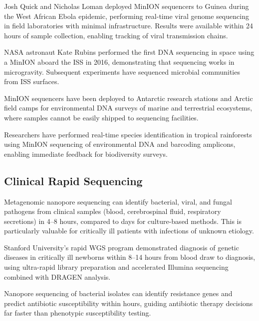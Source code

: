 \begin{description}[style=nextline, itemsep=3pt]
  \item[Ebola outbreak (2015--2016)] Josh Quick and Nicholas Loman deployed MinION sequencers to Guinea during the West African Ebola epidemic, performing real-time viral genome sequencing in field laboratories with minimal infrastructure. Results were available within 24 hours of sample collection, enabling tracking of viral transmission chains.

  \item[International Space Station] NASA astronaut Kate Rubins performed the first DNA sequencing in space using a MinION aboard the ISS in 2016, demonstrating that sequencing works in microgravity. Subsequent experiments have sequenced microbial communities from ISS surfaces.

  \item[Antarctic and Arctic research] MinION sequencers have been deployed to Antarctic research stations and Arctic field camps for environmental DNA surveys of marine and terrestrial ecosystems, where samples cannot be easily shipped to sequencing facilities.

  \item[Rainforest biodiversity] Researchers have performed real-time species identification in tropical rainforests using MinION sequencing of environmental DNA and barcoding amplicons, enabling immediate feedback for biodiversity surveys.
\end{description}

\subsection{Clinical Rapid Sequencing}
\label{subsec:emerging:clinical-rapid}

\begin{description}[style=nextline, itemsep=3pt]
  \item[Pathogen identification] Metagenomic nanopore sequencing can identify bacterial, viral, and fungal pathogens from clinical samples (blood, cerebrospinal fluid, respiratory secretions) in 4--8 hours, compared to days for culture-based methods. This is particularly valuable for critically ill patients with infections of unknown etiology.

  \item[Rapid whole-genome sequencing for neonates] Stanford University's rapid \acrshort{WGS} program demonstrated diagnosis of genetic diseases in critically ill newborns within 8--14 hours from blood draw to diagnosis, using ultra-rapid library preparation and accelerated Illumina sequencing combined with DRAGEN analysis.

  \item[Antimicrobial resistance profiling] Nanopore sequencing of bacterial isolates can identify resistance genes and predict antibiotic susceptibility within hours, guiding antibiotic therapy decisions far faster than phenotypic susceptibility testing.
\end{description}


